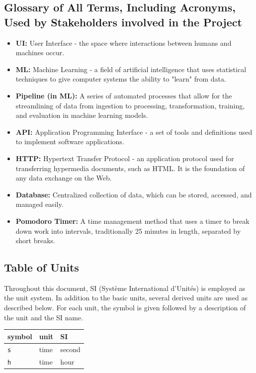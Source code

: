 \documentclass[12pt]{article}
\begin{document}
\subsection{Glossary of All Terms, Including Acronyms, Used by Stakeholders involved in the Project}
\begin{itemize}
    \item \textbf{UI:} User Interface - the space where interactions between humans and machines occur.
    \item \textbf{ML:} Machine Learning - a field of artificial intelligence that uses statistical techniques to give computer systems the ability to "learn" from data.
    \item \textbf{Pipeline (in ML):} A series of automated processes that allow for the streamlining of data from ingestion to processing, transformation, training, and evaluation in machine learning models.
    \item \textbf{API:} Application Programming Interface - a set of tools and definitions used to implement software applications.
    \item \textbf{HTTP:} Hypertext Transfer Protocol - an application protocol used for transferring hypermedia documents, such as HTML. It is the foundation of any data exchange on the Web.
    \item \textbf{Database:} Centralized collection of data, which can be stored, accessed, and managed easily.
    \item \textbf{Pomodoro Timer:} A time management method that uses a timer to break down work into intervals, traditionally 25 minutes in length, separated by short breaks.
\end{itemize}
\subsection{Table of Units}

Throughout this document, SI (Syst\`{e}me International d'Unit\'{e}s) is employed
as the unit system.  In addition to the basic units, several derived units are
used as described below.  For each unit, the symbol is given followed by a
description of the unit and the SI name.

\begin{tabular}{ |l|l|l|  }

\hline
symbol & unit & SI \\
\hline
\texttt{s} & time & second\\
\hline
\texttt{h} & time & hour\\
\hline
\end{tabular}
\end{document}
